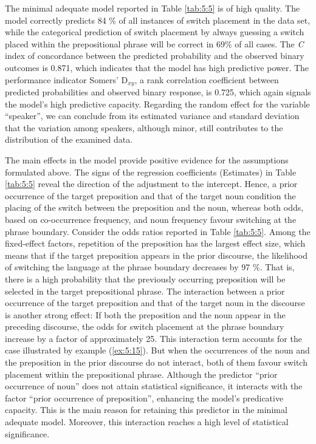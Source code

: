 \noindent The minimal adequate model reported in Table  \ref{tab:5:5} is of high quality. The model correctly predicts 84 \% of all instances of switch placement in the data set, while the categorical prediction of switch placement by always guessing a switch placed within the prepositional phrase will be correct in 69\% of all cases. The \textit{C} index of concordance between the predicted probability and the observed binary outcomes is 0.871, which indicates that the model has high predictive power. The performance indicator Somers' D\(_{xy}\), a rank correlation coefficient between predicted probabilities and observed binary response, is 0.725, which again signals the model’s high predictive capacity. Regarding the random effect for the variable “speaker”, we can conclude from its estimated variance and standard deviation that the variation among speakers, although minor, still contributes to the distribution of the examined data.

The main effects in the model provide positive evidence for the assumptions formulated above. The signs of the regression coefficients (Estimates) in Table \ref{tab:5:5} reveal the direction of the adjustment to the intercept. Hence, a prior occurrence of the target preposition and that of the target noun condition the placing of the switch between the preposition and the noun, whereas both odds, based on co-occurrence frequency, and noun frequency favour switching at the phrase boundary. Consider the odds ratios reported in Table \ref{tab:5:5}. Among the fixed-effect factors, repetition of the preposition has the largest effect size, which means that if the target preposition appears in the prior discourse, the likelihood of switching the language at the phrase boundary decreases by 97 \%. That is, there is a high probability that the previously occurring preposition will be selected in the target prepositional phrase. The interaction between a prior occurrence of the target preposition and that of the target noun in the discourse is another strong effect: If both the preposition and the noun appear in the preceding discourse, the odds for switch placement at the phrase boundary increase by a factor of approximately 25. This interaction term accounts for the case illustrated by example (\ref{ex:5:15}). But when the occurrences of the noun and the preposition in the prior discourse do not interact, both of them favour switch placement within the prepositional phrase. Although the predictor “prior occurrence of noun” does not attain statistical significance, it interacts with the factor “prior occurrence of preposition”, enhancing the model's predicative capacity. This is the main reason for retaining this predictor in the minimal adequate model. Moreover, this interaction reaches a high level of statistical significance.

